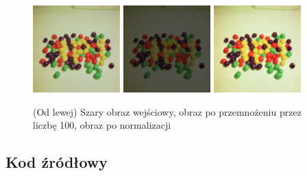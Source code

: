 \documentclass[final,a4paper,openany,12pt]{mwbk}
\begin{document}
\begin{figure}[H]
	\begin{center}
		\includegraphics[width=0.3\textwidth]{2/2Color_Const_Multipl_Original}
		\includegraphics[width=0.3\textwidth]{2/2Color_Const_Multipl_Result}
		\includegraphics[width=0.3\textwidth]{2/2Color_Const_Multipl_Result_Norm}
	\end{center}
	\caption{(Od lewej) Szary obraz wejściowy, obraz po przemnożeniu przez liczbę 100, obraz po normalizacji }

\end{figure}

\subsection*{Kod źródłowy}
\end{document}
